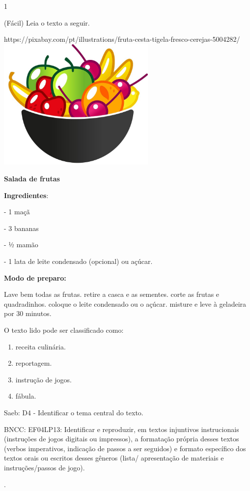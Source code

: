 \begin{itemize}
{{{\begin{itemize}
\num{1}

(Fácil) Leia o texto a seguir.

https://pixabay.com/pt/illustrations/fruta-cesta-tigela-fresco-cerejas-5004282/\includegraphics[width=3.05646in,height=2.55903in]{media/image12.jpeg}

\textbf{Salada de frutas }

\textbf{Ingredientes}:

- 1 maçã

- 3 bananas

- ½ mamão

- 1 lata de leite condensado (opcional) ou açúcar.

\textbf{Modo de preparo: }

Lave bem todas as frutas. retire a casca e as sementes. corte as frutas
e quadradinhos. coloque o leite condensado ou o açúcar. misture e leve à
geladeira por 30 minutos.

O texto lido pode ser classificado como:

\begin{enumerate}
\def\labelenumi{(\Alph{enumi})}
\item
  receita culinária.
\item
  reportagem.
\item
  instrução de jogos.
\item
  fábula.
\end{enumerate}

Saeb: D4 - Identificar o tema central do texto.

BNCC: EF04LP13: Identificar e reproduzir, em textos injuntivos
instrucionais (instruções de jogos digitais ou impressos), a formatação
própria desses textos (verbos imperativos, indicação de passos a ser
seguidos) e formato específico dos textos orais ou escritos desses
gêneros (lista/ apresentação de materiais e instruções/passos de jogo).

.


\end{itemize}}}}
\end{itemize}
